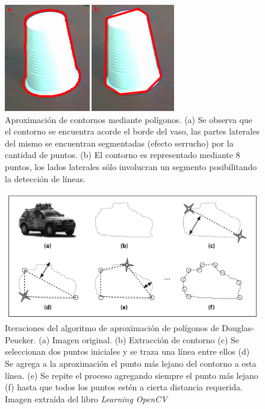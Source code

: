 \begin{figure}[htpb]
\begin{center}
  \includegraphics[scale=0.8]{vision/figures/polyaprox.png}
\end{center}
  \caption[Aproximaci\'on de contornos mediante pol\'igonos]{\small Aproximaci\'on de contornos mediante pol\'igonos. (a) Se observa que el contorno se encuentra acorde el borde del vaso, las
  partes laterales del mismo se encuentran segmentadas (efecto serrucho) por la cantidad de puntos. (b) El contorno es representado mediante
  8 puntos, los lados laterales s\'olo involucran un segmento posibilitando la detecci\'on de l\'ineas.}
  \label{fig:polyVasos}
\end{figure}

\begin{figure}[htpb]
\begin{center}
  \includegraphics[scale=0.6]{vision/figures/douglas-pecker.png}
\end{center}
  \caption[Algoritmo de aproximaci\'on de pol\'igonos]{\small Iteraciones del algoritmo de aproximaci\'on de pol\'igonos de Douglas-Peucker. (a) Imagen original. (b) Extracci\'on de contorno
  (c) Se seleccionan dos puntos iniciales y se traza una l\'inea entre ellos (d) Se agrega a la aproximaci\'on el punto m\'as lejano del contorno a esta l\'inea.
  (e) Se repite el proceso agregando siempre el punto m\'as lejano (f) hasta que todos los puntos est\'en a cierta distancia requerida. Imagen extra\'ida del libro \textit{Learning OpenCV}\cite{lopencv}}
  \label{fig:polyaprox}
\end{figure}

